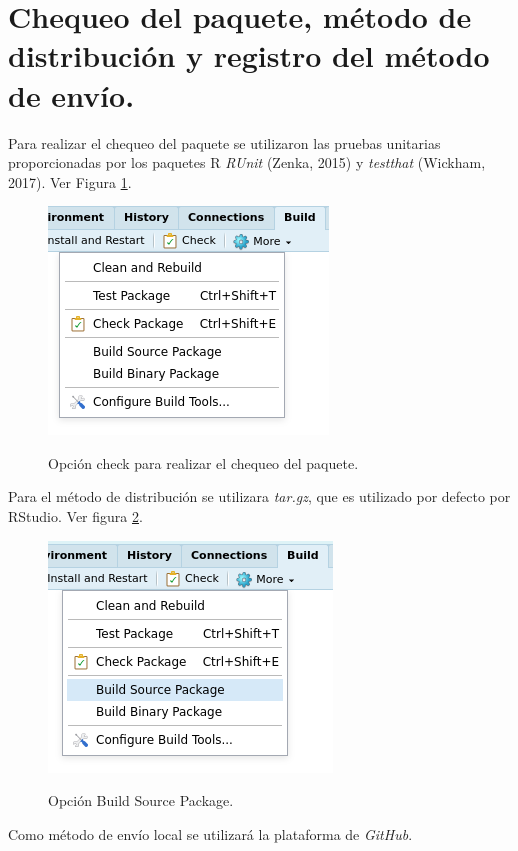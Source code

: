 \section{Chequeo del paquete, método de distribución y registro del método de envío.}

	Para realizar el chequeo del paquete se utilizaron las pruebas unitarias proporcionadas por los paquetes R \textit{RUnit} (Zenka, 2015) y \textit{testthat} (Wickham, 2017). Ver Figura \ref{fig:check}.\\

\begin{figure}[h!]
	\caption{Opción check para realizar el chequeo del paquete.}
	\centering
	\includegraphics[scale=0.75]{check.png}
	\label{fig:check}
\end{figure}

	Para el método de distribución se utilizara \textit{tar.gz}, que es utilizado por defecto por RStudio. Ver figura \ref{fig:build}. \\
	

\begin{figure}[h!]
	\caption{Opción Build Source Package.}
	\centering
	\includegraphics[scale=0.8]{build.png}
	\label{fig:build}
\end{figure}
	
	Como método de envío local se utilizará la plataforma de \textit{GitHub}.\\
	
